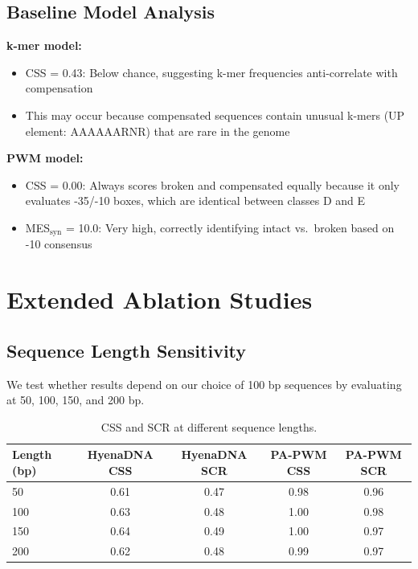 \documentclass{article}
\begin{document}
\subsection{Baseline Model Analysis}

\textbf{k-mer model:}
\begin{itemize}
\item CSS = 0.43: Below chance, suggesting k-mer frequencies anti-correlate with compensation
\item This may occur because compensated sequences contain unusual k-mers (UP element: AAAAAARNR) that are rare in the genome
\end{itemize}

\textbf{PWM model:}
\begin{itemize}
\item CSS = 0.00: Always scores broken and compensated equally because it only evaluates -35/-10 boxes, which are identical between classes D and E
\item MES$_\text{syn}$ = 10.0: Very high, correctly identifying intact vs.\ broken based on -10 consensus
\end{itemize}

\section{Extended Ablation Studies}
\label{app:ablations}

\subsection{Sequence Length Sensitivity}

We test whether results depend on our choice of 100 bp sequences by evaluating at 50, 100, 150, and 200 bp.

\begin{table}[H]
\caption{CSS and SCR at different sequence lengths.}
\begin{center}
\small
\begin{tabular}{lcccc}
\toprule
Length (bp) & HyenaDNA CSS & HyenaDNA SCR & PA-PWM CSS & PA-PWM SCR \\
\midrule
50 & 0.61 & 0.47 & 0.98 & 0.96 \\
100 & 0.63 & 0.48 & 1.00 & 0.98 \\
150 & 0.64 & 0.49 & 1.00 & 0.97 \\
200 & 0.62 & 0.48 & 0.99 & 0.97 \\
\bottomrule
\end{tabular}
\end{center}
\end{table}
\end{document}
